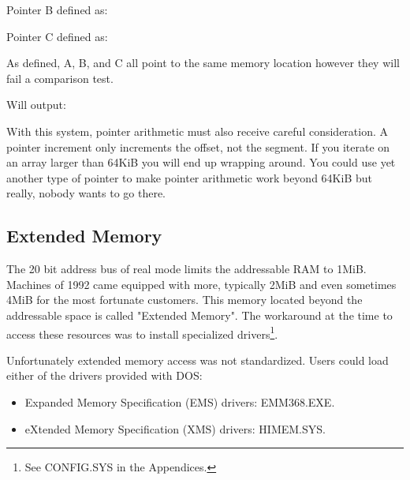 \documentclass[book.tex]{subfiles}
\begin{document}
\bigskip

Pointer B defined as:\\
\par
\begin{minipage}{\textwidth}

\end{minipage}

\bigskip

Pointer C defined as:\\
\par
\begin{minipage}{\textwidth}

\end{minipage}

As defined, A, B, and C all point to the same memory location however they will fail a comparison test.\\

\begin{minipage}{\textwidth}

\end{minipage}
\par
Will output:\\

\begin{minipage}{\textwidth}

\end{minipage}
\par

With this system, pointer arithmetic must also receive careful consideration. A  pointer increment only increments the offset, not the segment. If you iterate on an array larger than 64KiB you will end up wrapping around. You could use yet another type of pointer  to make pointer arithmetic work beyond 64KiB but really, nobody wants to go there.




  \subsection{Extended Memory}

The 20 bit address bus of real mode limits the addressable RAM to 1MiB. Machines of 1992 came equipped with more, typically 2MiB and even sometimes 4MiB for the most fortunate customers. This memory located beyond the addressable space is called "Extended Memory". The workaround at the time to access these resources was to install specialized drivers\footnote{See CONFIG.SYS in the Appendices.}.\\
\par
Unfortunately extended memory access was not standardized. Users could load either of the drivers provided with DOS:
\begin{itemize}
\item Expanded Memory Specification (EMS) drivers: EMM368.EXE.
\item eXtended Memory Specification (XMS) drivers: HIMEM.SYS.
\end{itemize}
\end{document}
